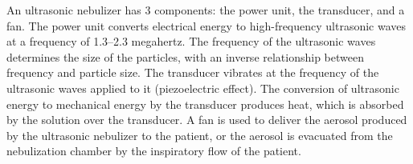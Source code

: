 \documentclass[12pt]{article}
\begin{document}
An ultrasonic nebulizer has 3 components: the power unit, the transducer, and a fan. The power unit converts electrical energy to high-frequency ultrasonic waves at a frequency of 1.3–2.3 megahertz. The frequency of the ultrasonic waves determines the size of the particles, with an inverse relationship between frequency and particle size. The transducer vibrates at the frequency of the ultrasonic waves applied to it (piezoelectric effect). The conversion of ultrasonic energy to mechanical energy by the transducer produces heat, which is absorbed by the solution over the transducer. A fan is used to deliver the aerosol produced by the ultrasonic nebulizer to the patient, or the aerosol is evacuated from the nebulization chamber by the inspiratory flow of the patient.
\end{document}
